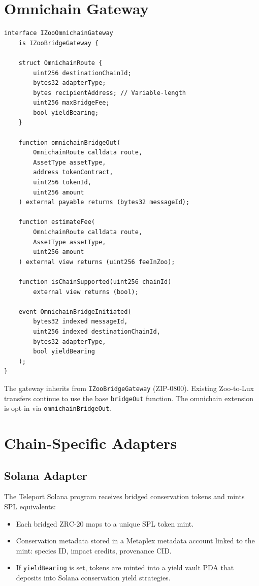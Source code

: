 \documentclass[11pt,letterpaper]{article}
\begin{document}
\section{Omnichain Gateway}
\label{sec:gateway}

\begin{lstlisting}[language=Solidity,caption=IZooOmnichainGateway interface]
interface IZooOmnichainGateway
    is IZooBridgeGateway {

    struct OmnichainRoute {
        uint256 destinationChainId;
        bytes32 adapterType;
        bytes recipientAddress; // Variable-length
        uint256 maxBridgeFee;
        bool yieldBearing;
    }

    function omnichainBridgeOut(
        OmnichainRoute calldata route,
        AssetType assetType,
        address tokenContract,
        uint256 tokenId,
        uint256 amount
    ) external payable returns (bytes32 messageId);

    function estimateFee(
        OmnichainRoute calldata route,
        AssetType assetType,
        uint256 amount
    ) external view returns (uint256 feeInZoo);

    function isChainSupported(uint256 chainId)
        external view returns (bool);

    event OmnichainBridgeInitiated(
        bytes32 indexed messageId,
        uint256 indexed destinationChainId,
        bytes32 adapterType,
        bool yieldBearing
    );
}
\end{lstlisting}

The gateway inherits from \texttt{IZooBridgeGateway} (ZIP-0800). Existing Zoo-to-Lux transfers continue to use the base \texttt{bridgeOut} function. The omnichain extension is opt-in via \texttt{omnichainBridgeOut}.

\section{Chain-Specific Adapters}
\label{sec:adapters}

\subsection{Solana Adapter}

The Teleport Solana program receives bridged conservation tokens and mints SPL equivalents:

\begin{itemize}
    \item Each bridged ZRC-20 maps to a unique SPL token mint.
    \item Conservation metadata stored in a Metaplex metadata account linked to the mint: species ID, impact credits, provenance CID.
    \item If \texttt{yieldBearing} is set, tokens are minted into a yield vault PDA that deposits into Solana conservation yield strategies.
\end{itemize}
\end{document}
